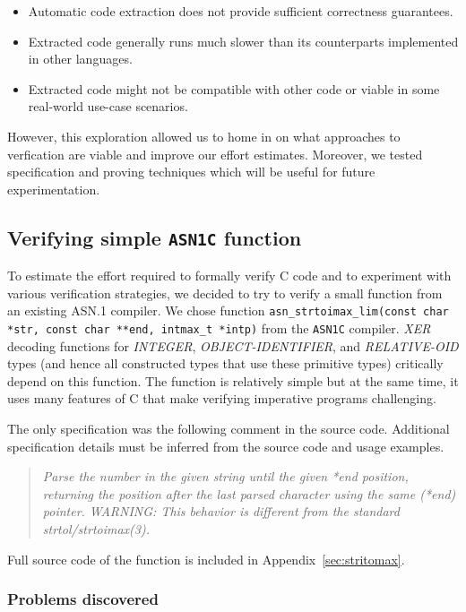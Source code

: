 \documentclass[acmsmall,nonacm]{acmart}
\begin{document}
\begin{itemize}
\item Automatic code extraction does not provide sufficient correctness guarantees.
\item Extracted code generally runs much slower than its counterparts implemented in other languages.
\item Extracted code might not be compatible with other code or viable in some real-world use-case scenarios.
\end{itemize}

However, this exploration allowed us to home in on what approaches
to verfication are viable and improve our effort estimates. Moreover, we tested specification and proving techniques which will be useful for future experimentation.

\subsection{Verifying simple  \texttt{ASN1C} function}

To estimate the effort required to formally verify C code and to
experiment with various verification strategies, we decided to try to
verify a small function from an existing ASN.1 compiler. We chose
function \texttt{asn\_strtoimax\_lim(const char *str, const char
  **end, intmax\_t *intp)} from the \texttt{ASN1C} compiler. \emph{XER}
decoding functions for \emph{INTEGER}, \emph{OBJECT-IDENTIFIER}, and
\emph{RELATIVE-OID} types (and hence all constructed types that use
these primitive types) critically depend on this function. The
function is relatively simple but at the same time, it uses many features
of C that make verifying imperative programs challenging.

The only specification was the following comment in the
source code. Additional specification details must be inferred from
the source code and usage examples.

\begin{quote}
 { \it Parse the number in the given string until the given *end position,
 returning the position after the last parsed character using the
 same (*end) pointer.
 WARNING: This behavior is different from the standard strtol/strtoimax(3). }
\end{quote}

Full source code of the function is included in Appendix~\ref{sec:stritomax}.

\subsubsection{Problems discovered}
\end{document}
